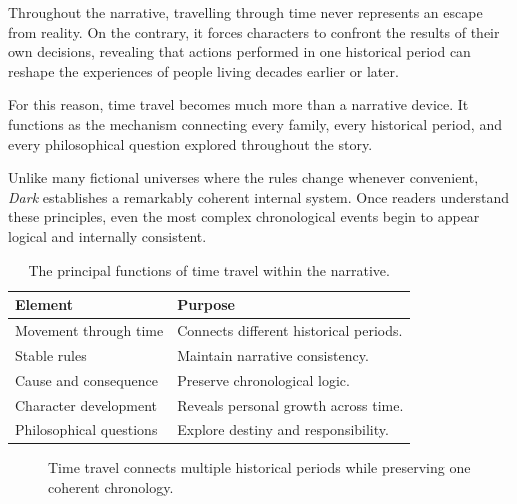 \documentclass[12pt,oneside,openany]{book}
\begin{document}
Throughout the narrative, travelling through time never represents an escape
from reality. On the contrary, it forces characters to confront the results of
their own decisions, revealing that actions performed in one historical period
can reshape the experiences of people living decades earlier or later.

For this reason, time travel becomes much more than a narrative device. It
functions as the mechanism connecting every family, every historical period,
and every philosophical question explored throughout the story.

Unlike many fictional universes where the rules change whenever convenient,
\textit{Dark} establishes a remarkably coherent internal system. Once readers
understand these principles, even the most complex chronological events begin
to appear logical and internally consistent.

\begin{table}[H]
\centering
\begin{tabular}{|p{4cm}|p{8cm}|}
\hline
\textbf{Element} & \textbf{Purpose}\\
\hline
Movement through time & Connects different historical periods.\\
\hline
Stable rules & Maintain narrative consistency.\\
\hline
Cause and consequence & Preserve chronological logic.\\
\hline
Character development & Reveals personal growth across time.\\
\hline
Philosophical questions & Explore destiny and responsibility.\\
\hline
\end{tabular}
\caption{The principal functions of time travel within the narrative.}
\end{table}

\begin{figure}[H]
\centering
{}

\caption{Time travel connects multiple historical periods while preserving one coherent chronology.}
\end{figure}
\end{document}
